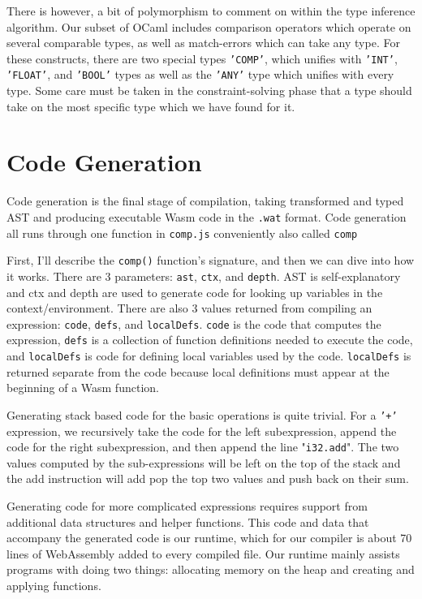 \documentclass[12pt,a4paper,twoside,openright]{report}
\begin{document}
There is however, a bit of polymorphism to comment on within the type inference algorithm.
Our subset of OCaml includes comparison operators which operate on several comparable types, as well as match-errors which can take any type.
For these constructs, there are two special types {\tt 'COMP'}, which unifies with {\tt 'INT'}, {\tt 'FLOAT'}, and {\tt 'BOOL'} types as well as the {\tt 'ANY'} type which unifies with every type.
Some care must be taken in the constraint-solving phase that a type should take on the most specific type which we have found for it.

\section{Code Generation}
Code generation is the final stage of compilation, taking transformed and typed AST and producing executable Wasm code in the {\tt .wat} format.
Code generation all runs through one function in {\tt comp.js} conveniently also called {\tt comp}

First, I'll describe the {\tt comp()} function's signature, and then we can dive into how it works.
There are 3 parameters: {\tt ast}, {\tt ctx}, and {\tt depth}.
AST is self-explanatory and ctx and depth are used to generate code for looking up variables in the context/environment.
There are also 3 values returned from compiling an expression: {\tt code}, {\tt defs}, and {\tt localDefs}.
{\tt code} is the code that computes the expression, {\tt defs} is a collection of function definitions needed to execute the code, and {\tt localDefs} is code for defining local variables used by the code.
{\tt localDefs} is returned separate from the code because local definitions must appear at the beginning of a Wasm function.

Generating stack based code for the basic operations is quite trivial.
For a {\tt '+'} expression, we recursively take the code for the left subexpression, append the code for the right subexpression, and then append the line "{\tt  i32.add}".
The two values computed by the sub-expressions will be left on the top of the stack and the add instruction will add pop the top two values and push back on their sum.

Generating code for more complicated expressions requires support from additional data structures and helper functions.
This code and data that accompany the generated code is our runtime, which for our compiler is about 70 lines of WebAssembly added to every compiled file.
Our runtime mainly assists programs with doing two things: allocating memory on the heap and creating and applying functions.
\end{document}
